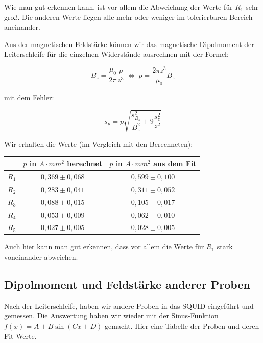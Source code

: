  Wie man gut erkennen kann, ist vor allem die Abweichung der Werte für $R_1$ sehr groß. Die anderen Werte liegen alle mehr oder weniger im tolerierbaren Bereich aneinander.
 
 Aus der magnetischen Feldstärke können wir das magnetische Dipolmoment der Leiterschleife für die einzelnen Widerstände ausrechnen mit der Formel:
 
$$ B_z = \frac{\mu_0}{2\pi}\frac{p}{z^3} \ \Leftrightarrow \  p = \frac{2\pi z^3}{\mu_0}B_z $$

mit dem Fehler:

$$s_p = p\sqrt{\frac{s_{B_z}^2}{B_z^2} + 9\frac{s_z^2}{z^2}}$$

Wir erhalten die Werte (im Vergleich mit den Berechneten):

\begin{center}
\begin{tabular}[H]{| c | c | c |} \hline
 & $p$ in $A\cdot mm^2$ berechnet & $p$ in $A\cdot mm^2$ aus dem Fit\\ \hline \hline
 $R_1$ & $0,369 \pm 0,068$ & $0,599\pm 0,100$\\
 $R_2$ & $0,283 \pm 0,041$ & $0,311\pm 0,052$\\
 $R_3$ & $0,088 \pm 0,015$ & $0,105\pm 0,017$\\
 $R_4$ & $0,053 \pm 0,009$ & $0,062\pm 0,010$\\
 $R_5$ & $0,027 \pm 0,005$ & $0,028\pm 0,005$\\ \hline
 \end{tabular}
 \end{center}
 
 Auch hier kann man gut erkennen, dass vor allem die Werte für $R_1$ stark voneinander abweichen.

\subsection{Dipolmoment und Feldstärke anderer Proben}

Nach der Leiterschleife, haben wir andere Proben in das SQUID eingeführt und gemessen. Die Auswertung haben wir wieder mit der Sinus-Funktion $f(x) = A + B\sin(Cx+D)$ gemacht. Hier eine Tabelle der Proben und deren Fit-Werte.

